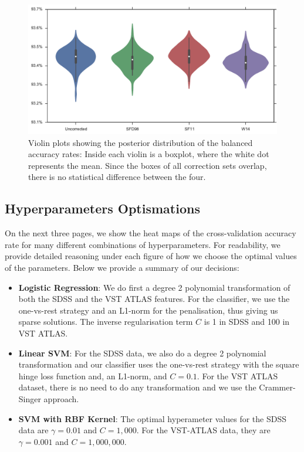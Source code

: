 \begin{figure}[tbp]
	\centering
	\includegraphics[width=\textwidth]{figures/4_expt1/violin_reddening_correction}
	\caption[Accuracy rates with four reddening correction sets]{Violin plots
		showing the posterior distribution of the balanced accuracy rates: Inside each
		violin is a boxplot, where the white dot represents the mean. Since the boxes of
		all correction sets overlap, there is no statistical difference between the four.}
	\label{fig:reddeningviolin}
\end{figure}

\subsection{Hyperparameters Optismations}
On the next three pages, we show the heat maps of the cross-validation accuracy rate
for many different combinations of hyperparameters. For readability, we provide detailed
reasoning under each figure of how we choose the optimal values of the parameters.
Below we provide a summary of our decisions:
\begin{itemize}
	\item \textbf{Logistic Regression}: We do first a degree 2 polynomial transformation of both
	the SDSS and the VST ATLAS features. For the classifier, we use the one-vs-rest
	strategy and an L1-norm for the penalisation, thus giving us sparse solutions. The inverse
	regularisation term $C$ is 1 in SDSS and 100 in VST ATLAS.
	\item \textbf{Linear SVM}: For the SDSS data, we also do a degree 2 polynomial transformation
	and our classifier uses the one-vs-rest strategy with the square hinge loss function
	and, an L1-norm, and $C=0.1$. For the VST ATLAS dataset, there is no need to do 
	any transformation and we use the Crammer-Singer approach.
	\item \textbf{SVM with RBF Kernel}: The optimal hyperameter values for the SDSS data are
	$\gamma = 0.01$ and $C = 1,000$. For the VST-ATLAS data, they are $\gamma = 0.001$ and
	$C = 1,000,000$.
\end{itemize}

